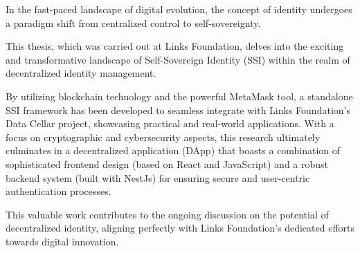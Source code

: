 \sommario
In the fast-paced landscape of digital evolution, the concept of identity undergoes a paradigm shift from centralized control to self-sovereignty. 

This thesis, which was carried out at Links Foundation, delves into the exciting and transformative 
landscape of Self-Sovereign Identity (SSI) within the realm of decentralized identity management. 

By utilizing blockchain technology and the powerful MetaMask tool, a standalone SSI framework has been developed 
to seamless integrate with Links Foundation's Data Cellar project, showcasing practical and real-world 
applications. With a focus on cryptographic and cybersecurity aspects, this research ultimately culminates 
in a decentralized application (DApp) that boasts a combination of sophisticated frontend design (based on 
React and JavaScript) and a robust backend system (built with NestJs) for ensuring secure and user-centric 
authentication processes. 

This valuable work contributes to the ongoing discussion on the potential of 
decentralized identity, aligning perfectly with Links Foundation's dedicated efforts towards digital innovation.